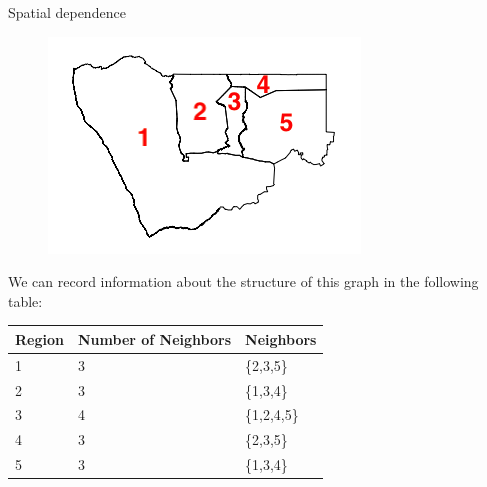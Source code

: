 \documentclass[10pt,t]{beamer}
\begin{document}
\begin{frame}{Spatial dependence}

\begin{figure}
	\centering \includegraphics[scale=0.4]{namibia_admin1_subset.png}
\end{figure}

We can record information about the structure of this graph in the following table:

\vspace{0.3cm}

\begin{table}[]
	\begin{tabular}{l|l|l}
		\multicolumn{1}{c|}{Region} & \multicolumn{1}{c|}{Number of Neighbors} & \multicolumn{1}{c}{Neighbors} \\ \hline
		1                           & 3                                        & \{2,3,5\}                     \\
		2                           & 3                                        & \{1,3,4\}                     \\
		3                           & 4                                        & \{1,2,4,5\}                   \\
		4                           & 3                                        & \{2,3,5\}                     \\
		5                           & 3                                        & \{1,3,4\}                    
	\end{tabular}
\end{table}

\end{frame}
\end{document}
